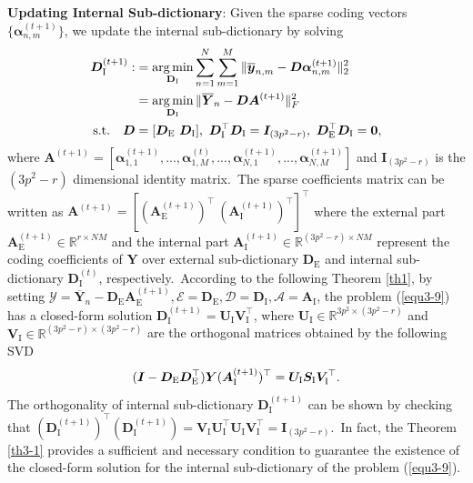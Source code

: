 \vspace{2mm}
\textbf{Updating Internal Sub-dictionary}: Given the sparse coding vectors $\{\bm{\alpha}_{n,m}^{(t+1)}\}$, we update the internal sub-dictionary by solving
\vspace{-2mm}
\begin{equation}\label{equ3-9}
\begin{split}
\bm{D}_{\text{I}}^{(t+1)}
:
&
=
\argmin_{\textbf{D}_{\text{I}}}
\sum_{n=1}^{N}\sum_{m=1}^{M}\|\bm{\overline{y}}_{n,m}-\bm{D}\bm{\alpha}_{n,m}^{(t+1)}\|_{2}^{2}
\\
&
=
\argmin_{\textbf{D}_{\text{I}}}
\|\bm{\overline{Y}}_{n}-\bm{D}\bm{A}^{(t+1)}\|_{F}^{2}
\\
\text{s.t.}
\quad
\bm{D}
&
=
[\bm{D}_{\text{E}}\ \bm{D}_{\text{I}}],\ \bm{D}_{\text{I}}^{\top}\bm{D}_{\text{I}} = \bm{I}_{(3p^2-r)},\ \bm{D}_{\text{E}}^{\top}\bm{D}_{\text{I}} = \bm{0},
\end{split}
\end{equation}
where $\textbf{A}^{(t+1)}=[\bm{\alpha}_{1,1}^{(t+1)},...,\bm{\alpha}_{1,M}^{(t)},...,\bm{\alpha}_{N,1}^{(t+1)},...,\bm{\alpha}_{N,M}^{(t+1)}]$ and $\bm{I}_{(3p^2-r)}$ is the $(3p^2-r)$ dimensional identity matrix.\ The sparse coefficients matrix can be written as $\bm{A}^{(t+1)}=[(\bm{A}_{\text{E}}^{(t+1)})^{\top}\ (\bm{A}_{\text{I}}^{(t+1)})^{\top}]^{\top}$ where the external part $\bm{A}_{\text{E}}^{(t+1)}\in\mathbb{R}^{r\times NM}$ and the internal part $\bm{A}_{\text{I}}^{(t+1)}\in\mathbb{R}^{(3p^2-r)\times NM}$ represent the coding coefficients of $\bm{Y}$ over external sub-dictionary $\bm{D}_{\text{E}}$ and internal sub-dictionary $\bm{D}_{\text{I}}^{(t)}$, respectively.\ According to the following Theorem \ref{th1}, by setting $\mathcal{Y}=\bm{\overline{Y}}_{n}-\bm{D}_{\text{E}}\bm{A}_{\text{E}}^{(t+1)},\mathcal{E}=\bm{D}_{\text{E}},\mathcal{D}=\bm{D}_{\text{I}},\mathcal{A}=\bm{A}_{\text{I}}$, the problem (\ref{equ3-9}) has a closed-form solution $\bm{D}_{\text{I}}^{(t+1)}=\bm{U}_{\text{I}}\bm{V}_{\text{I}}^{\top}$, where $\bm{U}_{\text{I}}\in\mathbb{R}^{3p^2\times (3p^2-r)}$ and $\bm{V}_{\text{I}}\in\mathbb{R}^{(3p^2-r)\times (3p^2-r)}$ are the orthogonal matrices obtained by the following SVD \cite{eckart1936approximation}
\vspace{-1mm}
\begin{equation}\label{equ3-10}
\vspace{-1mm}
(\bm{I}-\bm{D}_{\text{E}}\bm{D}_{\text{E}}^{\top})\bm{Y}(\bm{A}_{\text{I}}^{(t+1)})^{\top}
=
\bm{U}_{\text{I}}\bm{S}_{\text{I}}\bm{V}_{\text{I}}^{\top}.
\end{equation}
The orthogonality of internal sub-dictionary $\bm{D}_{\text{I}}^{(t+1)}$ can be shown by checking that
$(\bm{D}_{\text{I}}^{(t+1)})^{\top}(\bm{D}_{\text{I}}^{(t+1)})=\bm{V}_{\text{I}}\bm{U}_{\text{I}}^{\top}\bm{U}_{\text{I}}\bm{V}_{\text{I}}^{\top}=\bm{I}_{(3p^2-r)}$.\ In fact, the Theorem \ref{th3-1} provides a sufficient and necessary condition to guarantee the existence of the closed-form solution for the internal sub-dictionary of the problem (\ref{equ3-9}).

